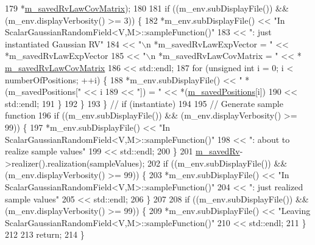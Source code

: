 \begin{DoxyCode}
179                                                  *\hyperlink{class_q_u_e_s_o_1_1_scalar_gaussian_random_field_aca6f26fffd99c7d8fee7a8300e623dcd}{m\_savedRvLawCovMatrix});
180 
181     \textcolor{keywordflow}{if} ((m\_env.subDisplayFile()) && (m\_env.displayVerbosity() >= 3)) \{
182       *m\_env.subDisplayFile() << \textcolor{stringliteral}{"In ScalarGaussianRandomField<V,M>::sampleFunction()"}
183                               << \textcolor{stringliteral}{": just instantiated Gaussian RV"}
184                               << \textcolor{stringliteral}{"\(\backslash\)n *m\_savedRvLawExpVector = "} << *m\_savedRvLawExpVector
185                               << \textcolor{stringliteral}{"\(\backslash\)n *m\_savedRvLawCovMatrix = "} << *
      \hyperlink{class_q_u_e_s_o_1_1_scalar_gaussian_random_field_aca6f26fffd99c7d8fee7a8300e623dcd}{m\_savedRvLawCovMatrix}
186                               << std::endl;
187       \textcolor{keywordflow}{for} (\textcolor{keywordtype}{unsigned} \textcolor{keywordtype}{int} i = 0; i < numberOfPositions; ++i) \{
188         *m\_env.subDisplayFile() << \textcolor{stringliteral}{" *(m\_savedPositions["} << i
189                                 << \textcolor{stringliteral}{"]) = "}                << *(\hyperlink{class_q_u_e_s_o_1_1_scalar_gaussian_random_field_a5993884088927e1eb818cb8d473c5be8}{m\_savedPositions}[i])
190                                 << std::endl;
191       \}
192     \}
193   \} \textcolor{comment}{// if (instantiate)}
194 
195   \textcolor{comment}{// Generate sample function}
196   \textcolor{keywordflow}{if} ((m\_env.subDisplayFile()) && (m\_env.displayVerbosity() >= 99)) \{
197     *m\_env.subDisplayFile() << \textcolor{stringliteral}{"In ScalarGaussianRandomField<V,M>::sampleFunction()"}
198                             << \textcolor{stringliteral}{": about to realize sample values"}
199                             << std::endl;
200   \}
201   \hyperlink{class_q_u_e_s_o_1_1_scalar_gaussian_random_field_ab8ca399444079041b75eb0986fe0fc80}{m\_savedRv}->realizer().realization(sampleValues);
202   \textcolor{keywordflow}{if} ((m\_env.subDisplayFile()) && (m\_env.displayVerbosity() >= 99)) \{
203     *m\_env.subDisplayFile() << \textcolor{stringliteral}{"In ScalarGaussianRandomField<V,M>::sampleFunction()"}
204                             << \textcolor{stringliteral}{": just realized sample values"}
205                             << std::endl;
206   \}
207 
208   \textcolor{keywordflow}{if} ((m\_env.subDisplayFile()) && (m\_env.displayVerbosity() >= 99)) \{
209     *m\_env.subDisplayFile() << \textcolor{stringliteral}{"Leaving ScalarGaussianRandomField<V,M>::sampleFunction()"}
210                             << std::endl;
211   \}
212 
213   \textcolor{keywordflow}{return};
214 \}
\end{DoxyCode}


